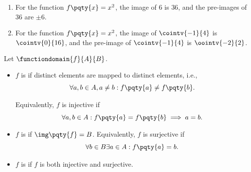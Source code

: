 \begin{examples}
    \begin{enumerate}
        \item For the function \(f\pqty{x} = x^2\), the image of \(6\) is \(36\), and the pre-images of \(36\) are \(\pm 6\).
        \item For the function \(f\pqty{x} = x^2\), the image of \(\cointv{-1}{4}\) is \(\cointv{0}{16}\), and the pre-image of \(\cointv{-1}{4}\) is \(\oointv{-2}{2}\).
    \end{enumerate}
\end{examples}

\begin{definition}
    Let \(\functiondomain{f}{A}{B}\).
    
    \begin{itemize}
        \item \(f\) is  if distinct elements are mapped to distinct elements, i.e.,
        \[
            \forall a, b \in A, a \neq b: f\pqty{a} \neq f\pqty{b}.
        \]

        Equivalently, \(f\) is injective if
        \[
            \forall a, b \in A: f\pqty{a} = f\pqty{b} \implies a = b.
        \]

        \item \(f\) is  if \(\img \pqty{f} = B\). Equivalently, \(f\) is surjective if
        \[
            \forall b \in B \exists a \in A: f\pqty{a} = b.
        \]

        \item \(f\) is  if \(f\) is both injective and surjective.
    \end{itemize}
\end{definition}

